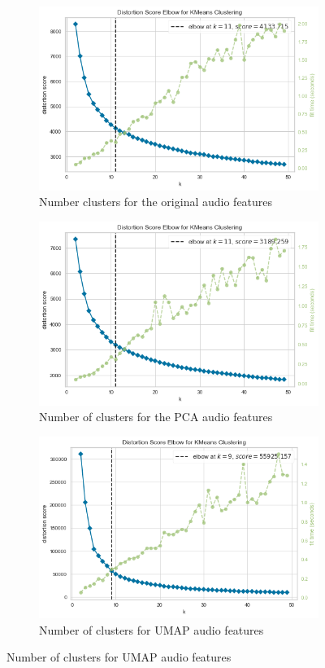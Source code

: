 \begin{figure}[!hbt]
\begin{subfigure}{.5\textwidth}
  \centering
  \includegraphics[width=.6\linewidth]{Outputs/Elbow Plot - Original Audio Features.png}  
  \captionsetup{justification=centering,margin=1cm}
  \caption{Number clusters for the original audio features}
  \label{fig:sub-first}
\end{subfigure}
\begin{subfigure}{.5\textwidth}
  \centering
  \includegraphics[width=.6\linewidth]{Outputs/Elbow Plot - PCA Features.png}  
  \captionsetup{justification=centering,margin=1cm}
  \caption{Number of clusters for the PCA audio features}
  \label{fig:sub-second}
\end{subfigure}
\medskip
\begin{subfigure}{.5\textwidth}
  \centering
  \includegraphics[width=.6\linewidth]{Outputs/Elbow Plot - UMAP Features.png}  
  \captionsetup{justification=centering,margin=1cm}
  \caption{Number of clusters for UMAP audio features}

\end{subfigure}
\end{figure}

